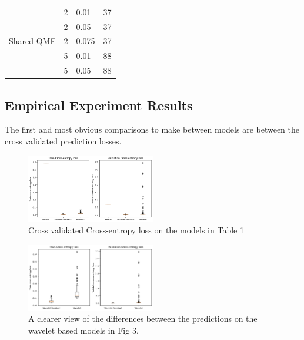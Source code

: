 \documentclass[9pt,conference]{IEEEtran}
\begin{document}
\begin{center}
\begin{tabular}{ |p{3cm}||p{3cm}|p{3cm}|p{3cm}|  }
        \multirow{5}{4em}{Shared QMF}  
                                        & 2 &  0.01 & 37\\
                                        & 2 &  0.05 & 37\\
                                        & 2 &  0.075 & 37\\
                                        & 5 & 0.01 & 88 \\
                                        & 5 & 0.05 & 88 \\                          
                                     
        \hline
    
    \end{tabular}
\end{center}


\subsection{Empirical Experiment Results}

The first and most obvious comparisons to make between models are between the cross validated prediction losses.

\begin{figure}[H]
    \centering
    \includegraphics[width=0.5\textwidth]{full_loss.png}
    \caption{Cross validated Cross-entropy loss on the models in Table 1}
\end{figure}

\begin{figure}[H]
    \centering
    \includegraphics[width=0.5\textwidth]{full_wavelet_loss.png}
    \caption{A clearer view of the differences between the predictions on the wavelet based models in Fig 3.}
\end{figure}
\end{document}
